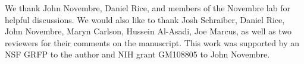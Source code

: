 We thank John Novembre, Daniel Rice, and members of the Novembre lab for helpful
discussions. We would also like to thank Josh Schraiber, Daniel Rice, John
Novembre, Maryn Carlson, Hussein Al-Asadi, Joe Marcus, as well as two reviewers
for their comments on the manuscript. This work was supported by an NSF GRFP to
the author and NIH grant GM108805 to John Novembre.
